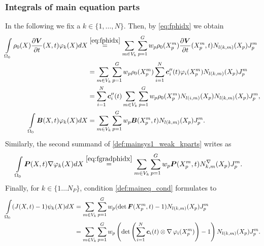 \subsubsection{Integrals of main equation parts}
In the following we fix a $k\in\{1,\ldots, N\}$.
Then, by \eqref{eq:fphidx} we obtain
\begin{align}
	\intor \rho_0(X)\d{\vV}{t}(X,t)\varphi_k(X)dX\nonumber
		&\re{eq:fphidx} \sumvk\sumgp w_p \rho_0(\pmp)\d{\vV}{t}(\pmp,t)\Nkmp\jmp\nonumber\\
		&= \sumvk\sumgp w_p \rho_0(\pmp)\sumi \vc_i''(t)\varphi_i(\pmp) \Nkmp\jmp\nonumber\\
		&= \sumi \vc_i''(t)\sumvk\sumgp w_p \rho_0(\pmp)N_{l(i,m)}(X_p) \Nkmp\jmp,\label{def:discreteVphidX}\\
	\intor\vB(X,t)\varphi_k(X)dX &= \sumvk\sumgp w_p \vB(\pmp,t)\Nkmp\jmp\nonumber.
\end{align}
Similarly, the second summand of \eqref{def:mainsys1_weak_kparts} writes as
\begin{align}
		\intor\vP(X,t)\dpk dX &\re{eq:fgradphidx} \sumvk\sumgp w_p\vP(\pmp,t)\dNkmp\jmp.\label{def:discretePgradphidX}
\end{align}
Finally, for $k\in\{1\ldots N_P\}$, condition \eqref{def:maineq_cond} formulates to
\begin{align}
	\int\limits_{\Omega_0}^{} (J(X,t)-1)\psi_k(X)dX &= \sum\limits_{m\in V_k}^{}\sum\limits_{p=1}^{G} w_p (\det\boldsymbol{F}(X^m_p,t)-1) N_{l(k,m)}(X_p)J^m_p\label{eq:weak_incomp_condition}\\
	&= \sum\limits_{m\in V_k}^{}\sum\limits_{p=1}^{G} w_p \left(\det\left(\sum\limits_{i=1}^{N} \boldsymbol{c}_i(t)\otimes \operatorname{\nabla}\varphi_i(X^m_p)\right)-1\right) N_{l(k,m)}(X_p)J^m_p.\nonumber
\end{align}

